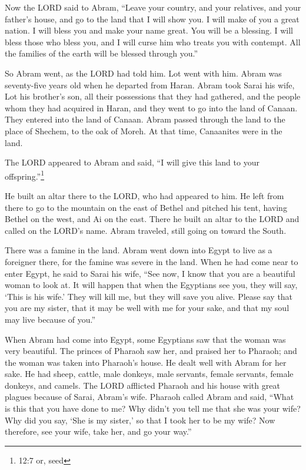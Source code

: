 \mychapter{}
\myverse*{}Now the LORD said to Abram, “Leave your country, and your relatives, and your father’s house, and go to the land that I will show you.  \myverse{}I will make of you a great nation. I will bless you and make your name great. You will be a blessing.  \myverse{}I will bless those who bless you, and I will curse him who treats you with contempt. All the families of the earth will be blessed through you.”

\myverse{}So Abram went, as the LORD had told him. Lot went with him. Abram was seventy-five years old when he departed from Haran.  \myverse{}Abram took Sarai his wife, Lot his brother’s son, all their possessions that they had gathered, and the people whom they had acquired in Haran, and they went to go into the land of Canaan. They entered into the land of Canaan.  \myverse{}Abram passed through the land to the place of Shechem, to the oak of Moreh. At that time, Canaanites were in the land.

\myverse{}The LORD appeared to Abram and said, “I will give this land to your offspring.”\footnote{12:7 or, seed}

He built an altar there to the LORD, who had appeared to him. \myverse{}He left from there to go to the mountain on the east of Bethel and pitched his tent, having Bethel on the west, and Ai on the east. There he built an altar to the LORD and called on the LORD’s name. \myverse{}Abram traveled, still going on toward the South.

\myverse{}There was a famine in the land. Abram went down into Egypt to live as a foreigner there, for the famine was severe in the land. \myverse{}When he had come near to enter Egypt, he said to Sarai his wife, “See now, I know that you are a beautiful woman to look at.  \myverse{}It will happen that when the Egyptians see you, they will say, ‘This is his wife.’ They will kill me, but they will save you alive. \myverse{}Please say that you are my sister, that it may be well with me for your sake, and that my soul may live because of you.”

\myverse{}When Abram had come into Egypt, some Egyptians saw that the woman was very beautiful. \myverse{}The princes of Pharaoh saw her, and praised her to Pharaoh; and the woman was taken into Pharaoh’s house. \myverse{}He dealt well with Abram for her sake. He had sheep, cattle, male donkeys, male servants, female servants, female donkeys, and camels. \myverse{}The LORD afflicted Pharaoh and his house with great plagues because of Sarai, Abram’s wife. \myverse{}Pharaoh called Abram and said, “What is this that you have done to me? Why didn’t you tell me that she was your wife? \myverse{}Why did you say, ‘She is my sister,’ so that I took her to be my wife? Now therefore, see your wife, take her, and go your way.”

